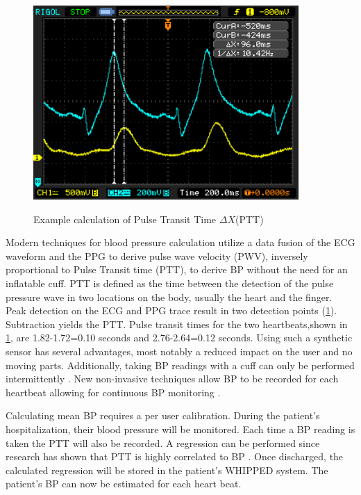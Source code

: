\begin{figure}
	\begin{center}
		\label{fig:PTT_calc}
		\includegraphics[scale=1,width=0.9\textwidth]{Images/PTT_Calculation.png} 
		\caption{Example calculation of Pulse Transit Time $ \Delta X $(PTT)}
	\end{center}
\end{figure}

Modern techniques for blood pressure calculation utilize a data fusion of the ECG waveform and the PPG to derive pulse wave velocity (PWV), inversely proportional to Pulse Transit time (PTT), to derive BP without the need for an inflatable cuff.  PTT is defined as the time between the detection of the pulse pressure wave in two locations on the body, usually the heart and the finger. Peak detection on the ECG and PPG trace result in two detection points (\cref{fig:PTT_calc}). Subtraction yields the PTT. Pulse transit times for the two heartbeats,shown in \cref{fig:PTT_calc}, are 1.82-1.72=0.10 seconds and 2.76-2.64=0.12 seconds. Using such a synthetic sensor has several advantages, most notably a reduced impact on the user and no moving parts. Additionally, taking BP readings with a cuff can only be performed intermittently \cite{DeMey1995}. New non-invasive techniques allow BP to be recorded for each heartbeat allowing for continuous BP monitoring \cite{Gesche2012}. 

Calculating mean BP requires a per user calibration. During the patient's hospitalization, their blood pressure will be monitored. Each time a BP reading is taken the PTT will also be recorded. A regression can be performed since research has shown that PTT is highly correlated to BP \cite{Chan2001}. Once discharged, the calculated regression will be stored in the patient's WHIPPED system. The patient's BP can now be estimated for each heart beat.  

